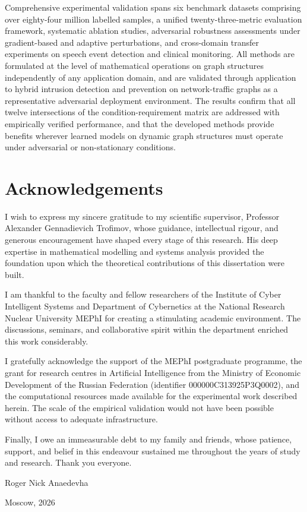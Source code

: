 Comprehensive experimental validation spans six benchmark datasets comprising over eighty-four million labelled samples, a unified twenty-three-metric evaluation framework, systematic ablation studies, adversarial robustness assessments under gradient-based and adaptive perturbations, and cross-domain transfer experiments on speech event detection and clinical monitoring. All methods are formulated at the level of mathematical operations on graph structures independently of any application domain, and are validated through application to hybrid intrusion detection and prevention on network-traffic graphs as a representative adversarial deployment environment. The results confirm that all twelve intersections of the condition-requirement matrix are addressed with empirically verified performance, and that the developed methods provide benefits wherever learned models on dynamic graph structures must operate under adversarial or non-stationary conditions.


\chapter*{Acknowledgements}

I wish to express my sincere gratitude to my scientific supervisor, Professor Alexander Gennadievich Trofimov, whose guidance, intellectual rigour, and generous encouragement have shaped every stage of this research. His deep expertise in mathematical modelling and systems analysis provided the foundation upon which the theoretical contributions of this dissertation were built.

I am thankful to the faculty and fellow researchers of the Institute of Cyber Intelligent Systems and Department of Cybernetics at the National Research Nuclear University MEPhI for creating a stimulating academic environment. The discussions, seminars, and collaborative spirit within the department enriched this work considerably.

I gratefully acknowledge the support of the MEPhI postgraduate programme, the grant for research centres in Artificial Intelligence from the Ministry of Economic Development of the Russian Federation (identifier 000000C313925P3Q0002), and the computational resources made available for the experimental work described herein. The scale of the empirical validation would not have been possible without access to adequate infrastructure.

Finally, I owe an immeasurable debt to my family and friends, whose patience, support, and belief in this endeavour sustained me throughout the years of study and research. Thank you everyone.

\hfill Roger Nick Anaedevha

\hfill Moscow, 2026


